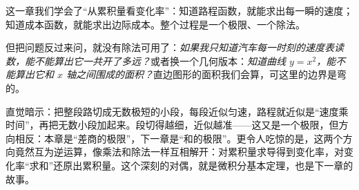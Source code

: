 这一章我们学会了“从累积量看变化率”：知道路程函数，就能求出每一瞬的速度；知道成本函数，就能求出边际成本。整个过程是一个极限、一个除法。

但把问题反过来问，就没有除法可用了：\emph{如果我只知道汽车每一时刻的速度表读数，能不能算出它一共开了多远？}或者换一个几何版本：\emph{知道曲线 $y=x^2$，能不能算出它和 $x$ 轴之间围成的面积？}直边图形的面积我们会算，可这里的边界是弯的。

直觉暗示：把整段路切成无数极短的小段，每段近似匀速，路程就近似是“速度乘时间”，再把无数小段加起来。段切得越细，近似越准——这又是一个极限，但方向相反：本章是“差商的极限”，下一章是“和的极限”。更令人吃惊的是，这两个方向竟然互为逆运算，像乘法和除法一样互相解开：对累积量求导得到变化率，对变化率“求和”还原出累积量。这个深刻的对偶，就是微积分基本定理，也是下一章的故事。
